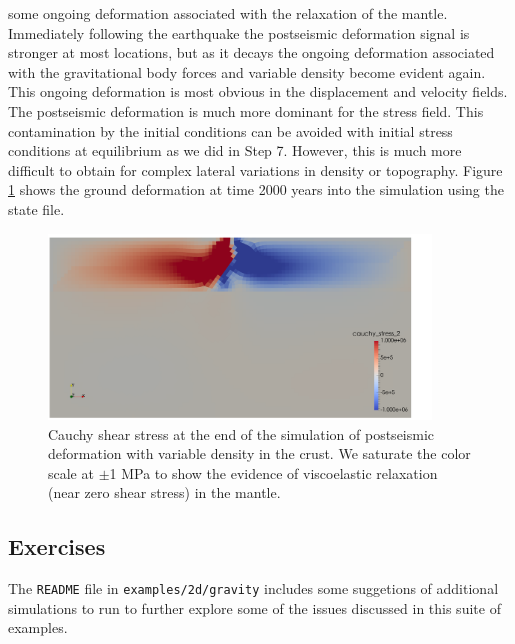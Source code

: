 some ongoing deformation associated with the relaxation of the mantle.
Immediately following the earthquake the postseismic deformation signal
is stronger at most locations, but as it decays the ongoing deformation
associated with the gravitational body forces and variable density
become evident again. This ongoing deformation is most obvious in
the displacement and velocity fields. The postseismic deformation
is much more dominant for the stress field. This contamination by
the initial conditions can be avoided with initial stress conditions
at equilibrium as we did in Step 7. However, this is much more difficult
to obtain for complex lateral variations in density or topography.
Figure \ref{fig:examples:gravity:2d:postseismic:vardensity:shearstress}
shows the ground deformation at time 2000 years into the simulation
using the state file. 

\begin{figure}
\begin{centering}
\includegraphics[width=4in]{tutorials/grav2d/figs/postseismic_vardensity-shearstress}
\par\end{centering}

\caption{Cauchy shear stress at the end of the simulation of postseismic deformation
with variable density in the crust. We saturate the color scale at
$\pm$1 MPa to show the evidence of viscoelastic relaxation (near
zero shear stress) in the mantle. \label{fig:examples:gravity:2d:postseismic:vardensity:shearstress}}
\end{figure}



\subsection{Exercises}

The \texttt{README} file in \texttt{examples/2d/gravity} includes
some suggetions of additional simulations to run to further explore
some of the issues discussed in this suite of examples.
